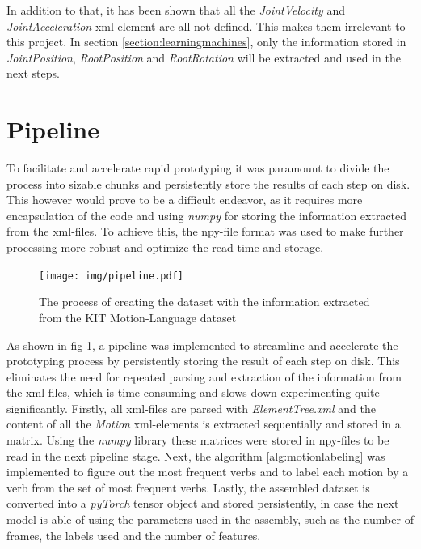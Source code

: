 			In addition to that, it has been shown that all the \textit{JointVelocity} and \textit{JointAcceleration} xml-element are all not defined. This makes them irrelevant to this project. In section \ref{section:learningmachines}, only the information stored in \textit{JointPosition}, \textit{RootPosition} and \textit{RootRotation} will be extracted and used in the next steps.
	\section{Pipeline}\label{sec:pipeline}
		 To facilitate and accelerate rapid prototyping it was paramount to divide the process into sizable chunks and persistently store the results of each step on disk. This however would prove to be a difficult endeavor, as it requires more encapsulation of the code and using \textit{numpy} for storing the information extracted from the xml-files. To achieve this, the npy-file format was used to make further processing more robust and optimize the read time and storage.
		\begin{figure}[H]
			\centering
			\texttt{[image: img/pipeline.pdf]}
			\caption{The process of creating the dataset with the information extracted from the KIT Motion-Language dataset}
			\label{fig:pipeline}
		\end{figure}
		As shown in fig \ref{fig:pipeline}, a pipeline was implemented to streamline and accelerate the prototyping process by persistently storing the result of each step on disk. This eliminates the need for repeated parsing and extraction of the information from the xml-files, which is time-consuming and slows down experimenting quite significantly. Firstly, all xml-files are parsed with \textit{ElementTree.xml} and the content of all the \textit{Motion} xml-elements is extracted sequentially and stored in a matrix. Using the \textit{numpy} library these matrices were stored in npy-files to be read in the next pipeline stage. Next, the algorithm \ref{alg:motionlabeling} was implemented to figure out the most frequent verbs and to label each motion by a verb from the set of most frequent verbs. Lastly, the assembled dataset is converted into a \textit{pyTorch} tensor object and stored persistently, in case the next model is able of using the parameters used in the assembly, such as the number of frames, the labels used and the number of features.
